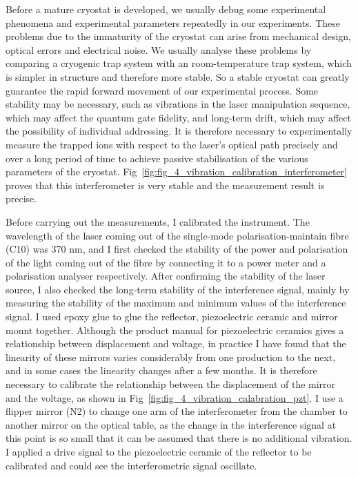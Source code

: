 Before a mature cryostat is developed, we usually debug some experimental phenomena and experimental parameters repeatedly in our experiments. These problems due to the immaturity of the cryostat can arise from mechanical design, optical errors and electrical noise. We usually analyse these problems by comparing a cryogenic trap system with an room-temperature trap system, which is simpler in structure and therefore more stable. So a stable cryostat can greatly guarantee the rapid forward movement of our experimental process. Some stability may be necessary, such as vibrations in the laser manipulation sequence, which may affect the quantum gate fidelity, and long-term drift, which may affect the possibility of individual addressing. It is therefore necessary to experimentally measure the trapped ions with respect to the laser's optical path precisely and over a long period of time to achieve passive stabilisation of the various parameters of the cryostat. Fig~\ref{fig:fig_4_vibration_calibration_interferometer} proves that this interferometer is very stable and the measurement result is precise.

Before carrying out the measurements, I calibrated the instrument. The wavelength of the laser coming out of the single-mode polarisation-maintain fibre (C10) was 370 nm, and I first checked the stability of the power and polarisation of the light coming out of the fibre by connecting it to a power meter and a polarisation analyser respectively. After confirming the stability of the laser source, I also checked the long-term stability of the interference signal, mainly by measuring the stability of the maximum and minimum values of the interference signal. I used epoxy glue to glue the reflector, piezoelectric ceramic and mirror mount together. Although the product manual for piezoelectric ceramics gives a relationship between displacement and voltage, in practice I have found that the linearity of these mirrors varies considerably from one production to the next, and in some cases the linearity changes after a few months. It is therefore necessary to calibrate the relationship between the displacement of the mirror and the voltage, as shown in Fig~\ref{fig:fig_4_vibration_calabration_pzt}. I use a flipper mirror (N2) to change one arm of the interferometer from the chamber to another mirror on the optical table, as the change in the interference signal at this point is so small that it can be assumed that there is no additional vibration. I applied a drive signal to the piezoelectric ceramic of the reflector to be calibrated and could see the interferometric signal oscillate.

